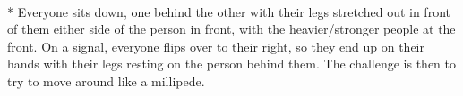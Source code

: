\begin{minipage}{\textwidth}
\\*
Everyone sits down, one behind the other with their legs stretched out in front of them either side of the person in front, with the heavier/stronger people at the front.  On a signal, everyone flips over to their right, so they end up on their hands with their legs resting on the person behind them.  The challenge is then to try to move around like a millipede.
\end{minipage}    \vfill
